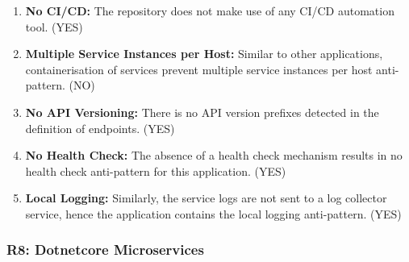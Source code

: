 \documentclass{Configuration_Files/PoliMi3i_thesis}
\begin{document}
\begin{enumerate}
    \item \textbf{No CI/CD:} The repository does not make use of any CI/CD automation tool. (YES)
    
    \item \textbf{Multiple Service Instances per Host:} Similar to other applications, containerisation of services prevent multiple service instances per host anti-pattern. (NO)
    
    \item \textbf{No API Versioning:} There is no API version prefixes detected in the definition of endpoints. (YES)
    
    \item \textbf{No Health Check:} The absence of a health check mechanism results in no health check anti-pattern for this application. (YES)
    
    \item \textbf{Local Logging:} Similarly, the service logs are not sent to a log collector service, hence the application contains the local logging anti-pattern. (YES)
\end{enumerate}

\subsubsection{R8: Dotnetcore Microservices}
\label{subsubsec:R8}
\end{document}
